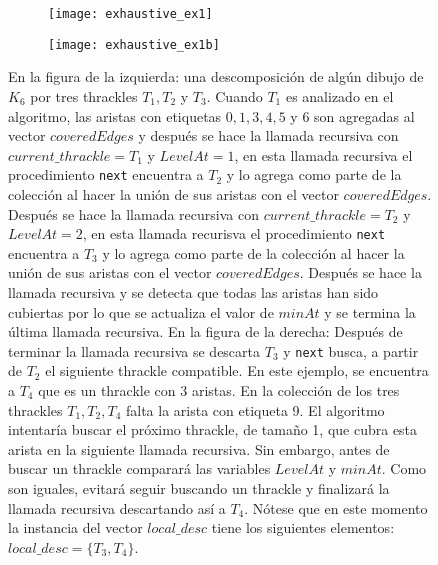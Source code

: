   \begin{figure}
    \centering
    \begin{subfigure}{.5\textwidth}
      \centering
      \texttt{[image: exhaustive\_ex1]}

    \end{subfigure}\hfill%
    \begin{subfigure}{.5\textwidth}
      \centering
      \texttt{[image: exhaustive\_ex1b]}

    \end{subfigure}\hfill%
    \caption{En la figura de la izquierda: una descomposición de algún dibujo de $K_6$ por tres thrackles
    $T_1,T_2$ y $T_3$. Cuando $T_1$ es analizado en el algoritmo, las aristas con etiquetas $0,1,3,4,5$ y
    $6$ son agregadas al vector $coveredEdges$ y después se hace la llamada recursiva con
    $current\_thrackle=T_1$ y $LevelAt=1$, en esta llamada recursiva el procedimiento \texttt{next}
    encuentra a $T_2$ y lo agrega como parte de la colección al hacer la unión de sus aristas con el vector
    $coveredEdges$. Después se  hace la llamada recursiva con $current\_thrackle=T_2$ y $LevelAt=2$, en
    esta llamada recurisva el procedimiento \texttt{next} encuentra a $T_3$ y lo agrega como parte de la
    colección al hacer la unión  de sus aristas con el vector $coveredEdges$. Después se hace la llamada
    recursiva y se detecta que todas las aristas han sido cubiertas por lo que se actualiza el valor de
    $minAt$ y se termina la última llamada recursiva. En la figura de la derecha: Después de terminar la
    llamada recursiva se descarta $T_3$ y \texttt{next} busca, a partir de $T_2$ el siguiente thrackle
    compatible. En este ejemplo, se encuentra a $T_4$ que es un thrackle con 3 aristas. En la colección de
    los tres thrackles $T_1,T_2,T_4$ falta la arista con etiqueta 9. El algoritmo intentaría buscar el
    próximo thrackle, de tamaño 1, que cubra esta arista en la siguiente llamada recursiva. Sin embargo,
    antes de buscar un thrackle comparará las variables $LevelAt$ y $minAt$. Como son iguales, evitará
    seguir buscando un thrackle y finalizará la llamada recursiva descartando así a $T_4$. Nótese que en este momento la instancia del vector $local\_desc$ tiene los siguientes elementos: $local\_desc=\{T_3,T_4\}$. }
    \label{fig:exhaustive1}
  \end{figure}

